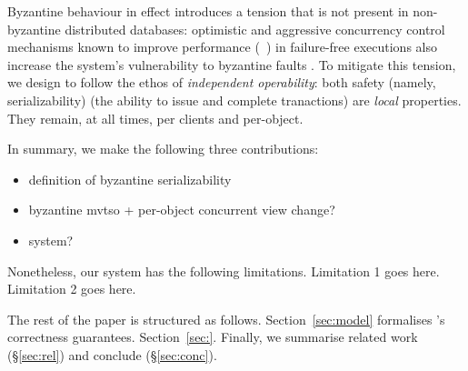 Byzantine behaviour in effect introduces a tension that is not present in non-byzantine
distributed databases: optimistic and aggressive concurrency control mechanisms known
to improve performance (~\cite{occ,mvtso,pipeline,tapir}) in failure-free executions also increase the system's vulnerability to byzantine faults . To mitigate this tension, we design \sys{} to follow the ethos of \textit{independent operability}: both safety (namely, serializability) (the ability to issue and complete tranactions)
are \textit{local} properties. They remain, at all times, per clients and per-object.
 

In summary, we make the following three contributions: 
\begin{itemize}
\item definition of byzantine serializability
\item  byzantine mvtso + per-object concurrent view change?
\item system?
\end{itemize}

Nonetheless, our system has the following limitations. Limitation 1 goes here. Limitation 2 goes here.

The rest of the paper is structured as follows. Section~\ref{sec:model} formalises \sys{}'s correctness guarantees.
Section~\ref{sec:}. Finally, we summarise related work (\S\ref{sec:rel}) and conclude (\S\ref{sec:conc}).

